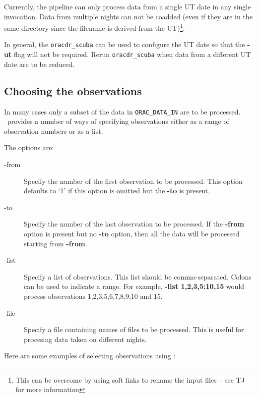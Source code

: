 \documentclass[twoside,11pt,nolof]{starlink}
\providecommand{\oracdr}{\xref{\textsc{orac-dr}}{sun230}{}}
\begin{document}
Currently, the pipeline can only process data from a single UT date in any
single invocation.  Data from multiple nights can not be coadded (even if they
are in the same directory since the filename is derived from the
UT)\footnote{This can be overcome by using soft links to rename the input files
-- see TJ for more information}.

In general, the \texttt{oracdr\_scuba} can be used to configure the
UT date so that the \textbf{-ut} flag will not be required.
Rerun \texttt{oracdr\_scuba} when data from a different UT date are to
be reduced.

\subsection{Choosing the observations}

In many cases only a subset of the data in \texttt{ORAC\_DATA\_IN} are to be
processed. \oracdr\ provides a number of ways of specifying observations
either as a range of observation numbers or as a list.

The options are:

\begin{description}
\item[-from] \mbox{}

Specify the number of the first observation to be processed.
This option defaults to `1' if this option is omitted but the \textbf{-to} is
present.

\item[-to] \mbox{}

Specify the number of the last observation to be processed. If
the \textbf{-from} option is present but no \textbf{-to} option, then
all the data will be processed starting from \textbf{-from}.

\item[-list] \mbox{}

Specify a list of observations. This list should be comma-separated. Colons
can be used to indicate a range. For example, \textbf{-list 1,2,3,5:10,15}
would process observations 1,2,3,5,6,7,8,9,10 and 15.

\item[-file] \mbox{}

Specify a file containing names of files to be processed. This is useful
for procesing data taken on different nights.

\end{description}

Here are some examples of selecting observations using \oracdr:
\end{document}
